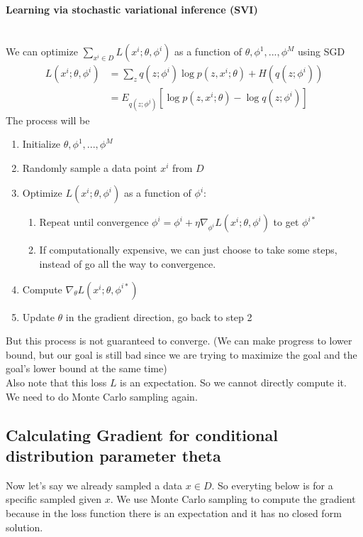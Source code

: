 \paragraph{Learning via stochastic variational inference (SVI)}\mbox{}\\
We can optimize $\sum_{x^i \in D}L(x^i;\theta, \phi^i)$ as a function of $\theta, \phi^1, ..., \phi^M$ using SGD
    \begin{align*}
        L(x^i; \theta, \phi^i) 
        & = \sum_{z} q(z; \phi^i) \log p(z, x^i;\theta) + H(q(z;\phi^i))\\
        & = E_{q(z;\phi^j)}[\log p(z,x^i;\theta) - \log q(z;\phi^i)]
    \end{align*}
The process will be 
    \begin{enumerate}
        \item Initialize $\theta, \phi^1, ..., \phi^M$
        \item Randomly sample a data point $x^i$ from $D$
        \item Optimize $L(x^i; \theta, \phi^i)$ as a function of $\phi^i$: 
            \begin{enumerate}
                \item Repeat until convergence $\phi^i = \phi^i + \eta \nabla_{\phi^i}L(x^i;\theta, \phi^i)$ to get $\phi^{i*}$
                \item If computationally expensive, we can just choose to take some steps, instead of go all the way to convergence.
            \end{enumerate}
        \item Compute $\nabla_\theta L(x^i;\theta,\phi^{i*})$
        \item Update $\theta$ in the gradient direction, go back to step 2
    \end{enumerate}
But this process is not guaranteed to converge. (We can make progress to lower bound, but our goal is still bad since we are trying to maximize the goal and the goal's lower bound at the same time) \\

Also note that this loss $L$ is an expectation. So we cannot directly compute it. We need to do Monte Carlo sampling again. 


\subsection{Calculating Gradient for conditional distribution parameter theta} 
Now let's say we already sampled a data $x \in D$. So everyting below is for a specific sampled given $x$. We use Monte Carlo sampling to compute the gradient because in the loss function there is an expectation and it has no closed form solution. \\ \par

